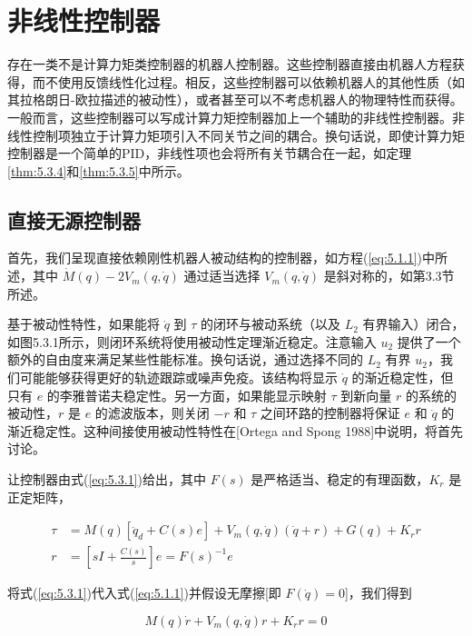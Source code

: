 \documentclass[UTF8,12pt,a4paper]{ctexart}
\begin{document}
\section{非线性控制器}

存在一类不是计算力矩类控制器的机器人控制器。这些控制器直接由机器人方程获得，而不使用反馈线性化过程。相反，这些控制器可以依赖机器人的其他性质（如其拉格朗日-欧拉描述的被动性），或者甚至可以不考虑机器人的物理特性而获得。一般而言，这些控制器可以写成计算力矩控制器加上一个辅助的非线性控制器。非线性控制项独立于计算力矩项引入不同关节之间的耦合。换句话说，即使计算力矩控制器是一个简单的PID，非线性项也会将所有关节耦合在一起，如定理\ref{thm:5.3.4}和\ref{thm:5.3.5}中所示。

\subsection{直接无源控制器}

首先，我们呈现直接依赖刚性机器人被动结构的控制器，如方程(\ref{eq:5.1.1})中所述，其中 $\dot{M}(q) - 2V_m(q, \dot{q})$ 通过适当选择 $V_m(q, \dot{q})$ 是斜对称的，如第3.3节所述。

基于被动性特性，如果能将 $\dot{q}$ 到 $\tau$ 的闭环与被动系统（以及 $L_2$ 有界输入）闭合，如图5.3.1所示，则闭环系统将使用被动性定理渐近稳定。注意输入 $u_2$ 提供了一个额外的自由度来满足某些性能标准。换句话说，通过选择不同的 $L_2$ 有界 $u_2$，我们可能能够获得更好的轨迹跟踪或噪声免疫。该结构将显示 $\dot{q}$ 的渐近稳定性，但只有 $e$ 的李雅普诺夫稳定性。另一方面，如果能显示映射 $\tau$ 到新向量 $r$ 的系统的被动性，$r$ 是 $e$ 的滤波版本，则关闭 $-r$ 和 $\tau$ 之间环路的控制器将保证 $e$ 和 $\dot{q}$ 的渐近稳定性。这种间接使用被动性特性在[Ortega and Spong 1988]中说明，将首先讨论。

让控制器由式(\ref{eq:5.3.1})给出，其中 $F(s)$ 是严格适当、稳定的有理函数，$K_r$ 是正定矩阵，

\begin{equation}\label{eq:5.3.1}
\begin{aligned}
\tau &= M(q)[\ddot{q}_d + C(s)e] + V_m(q, \dot{q})(\dot{q} + r) + G(q) + K_r r \\
r &= \left[sI + \frac{C(s)}{s}\right]e = F(s)^{-1}e
\end{aligned}
\end{equation}

将式(\ref{eq:5.3.1})代入式(\ref{eq:5.1.1})并假设无摩擦[即 $F(\dot{q}) = 0$]，我们得到

\begin{equation}\label{eq:5.3.2}
M(q)\dot{r} + V_m(q, \dot{q})r + K_r r = 0
\end{equation}
\end{document}
